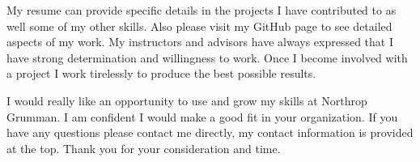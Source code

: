 \documentclass[10pt,a4paper,sans]{moderncv}        %
\begin{document}
My resume can provide specific details in the projects I have contributed to as well some of my
other skills. Also please visit my GitHub page to see detailed aspects of my work.  My instructors 
and advisors have always expressed that I have strong determination and willingness to work. Once I 
become involved with a project I work tirelessly to produce the best possible results.

I would really like an opportunity to use and grow my skills at Northrop Grumman. I am confident I would
make a good fit in your organization. If you have any questions please contact me directly, my
contact information is provided at the top. Thank you for your consideration and time.

\makeletterclosing
\end{document}
